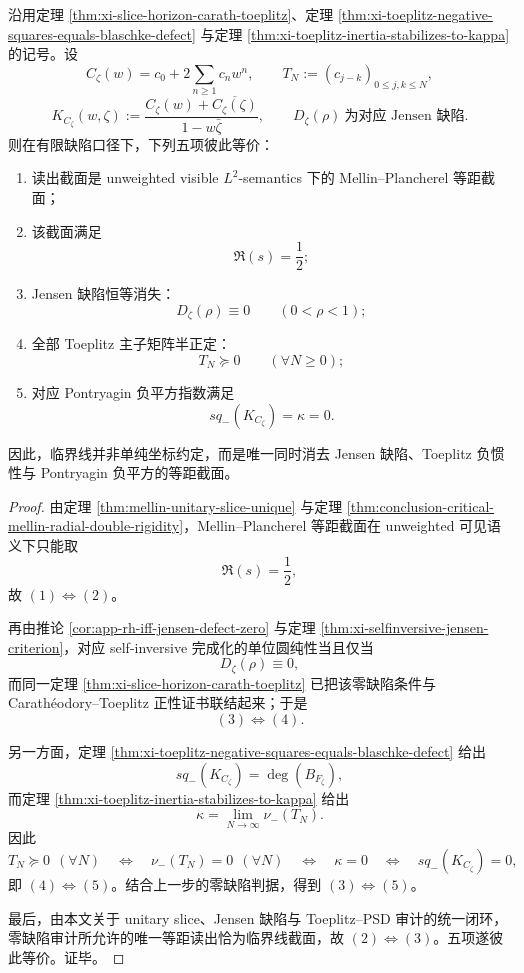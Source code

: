 \begin{theorem}[临界线作为唯一零缺陷等距截面]\label{thm:conclusion-unitary-slice-zero-defect-critical-rigidity}
沿用定理 \ref{thm:xi-slice-horizon-carath-toeplitz}、定理 \ref{thm:xi-toeplitz-negative-squares-equals-blaschke-defect} 与定理 \ref{thm:xi-toeplitz-inertia-stabilizes-to-kappa} 的记号。设
\[
C_\zeta(w)=c_0+2\sum_{n\ge 1}c_nw^n,
\qquad
T_N:=(c_{j-k})_{0\le j,k\le N},
\]
\[
K_{C_\zeta}(w,\zeta):=
\frac{C_\zeta(w)+\overline{C_\zeta(\zeta)}}{1-w\bar\zeta},
\qquad
D_\zeta(\rho)\ \text{为对应 Jensen 缺陷}.
\]
则在有限缺陷口径下，下列五项彼此等价：
\begin{enumerate}
  \item 读出截面是 unweighted visible \(L^2\)-semantics 下的 Mellin--Plancherel 等距截面；
  \item 该截面满足
  \[
  \Re(s)=\frac12;
  \]
  \item Jensen 缺陷恒等消失：
  \[
  D_\zeta(\rho)\equiv 0\qquad (0<\rho<1);
  \]
  \item 全部 Toeplitz 主子矩阵半正定：
  \[
  T_N\succeq 0\qquad (\forall N\ge 0);
  \]
  \item 对应 Pontryagin 负平方指数满足
  \[
  sq_-(K_{C_\zeta})=\kappa=0.
  \]
\end{enumerate}
因此，临界线并非单纯坐标约定，而是唯一同时消去 Jensen 缺陷、Toeplitz 负惯性与 Pontryagin 负平方的等距截面。
\end{theorem}
\begin{proof}
由定理 \ref{thm:mellin-unitary-slice-unique} 与定理 \ref{thm:conclusion-critical-mellin-radial-double-rigidity}，Mellin--Plancherel 等距截面在 unweighted 可见语义下只能取
\[
\Re(s)=\frac12,
\]
故 \((1)\Longleftrightarrow(2)\)。

再由推论 \ref{cor:app-rh-iff-jensen-defect-zero} 与定理 \ref{thm:xi-selfinversive-jensen-criterion}，对应 self-inversive 完成化的单位圆纯性当且仅当
\[
D_\zeta(\rho)\equiv 0,
\]
而同一定理 \ref{thm:xi-slice-horizon-carath-toeplitz} 已把该零缺陷条件与 Carath\'eodory--Toeplitz 正性证书联结起来；于是
\[
(3)\Longleftrightarrow(4).
\]

另一方面，定理 \ref{thm:xi-toeplitz-negative-squares-equals-blaschke-defect} 给出
\[
sq_-(K_{C_\zeta})=\deg(B_{F_\zeta}),
\]
而定理 \ref{thm:xi-toeplitz-inertia-stabilizes-to-kappa} 给出
\[
\kappa=\lim_{N\to\infty}\nu_-(T_N).
\]
因此
\[
T_N\succeq 0\ \ (\forall N)
\quad\Longleftrightarrow\quad
\nu_-(T_N)=0\ \ (\forall N)
\quad\Longleftrightarrow\quad
\kappa=0
\quad\Longleftrightarrow\quad
sq_-(K_{C_\zeta})=0,
\]
即 \((4)\Longleftrightarrow(5)\)。结合上一步的零缺陷判据，得到 \((3)\Longleftrightarrow(5)\)。

最后，由本文关于 unitary slice、Jensen 缺陷与 Toeplitz--PSD 审计的统一闭环，零缺陷审计所允许的唯一等距读出恰为临界线截面，故 \((2)\Longleftrightarrow(3)\)。五项遂彼此等价。证毕。
\end{proof}


